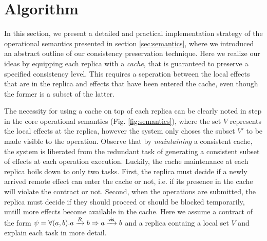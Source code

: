 \section{Algorithm}
%
In this section, we present a detailed and practical implementation
strategy of the operational semantics presented in section \ref{sec:semantics},
where we introduced an abstract outline of our consistency
preservation technique. Here we realize our ideas by equipping 
each replica with a \emph{cache}, that is guaranteed to
preserve a specified consistency level. This requires a seperation
between the local effects that are in the replica and effects that have
been entered the cache, even though the former is a subset of the latter. 

The necessity for using a cache on top of each replica  can be clearly noted 
in \visrule step in the core operational
semantics (Fig. \ref{fig:semantics}), where the set $V$
represents the local effects at the replica, however the system only
choses the subset $V'$ to be made visible to the operation. Observe
that by \emph{maintaining} a consistent cache, the system is liberated from the
redundant task of generating a consistent subset of effects at each
operation execution.
Luckily, the cache maintenance at each replica boils down to only two
tasks. First, the
replica must decide if a newly arrived remote effect can enter the
cache or not, i.e. if its presence in the cache will violate the
contract or not.  Second, when the operations are submitted, the replica
must decide if they should proceed or should be blocked temporarily,
untill more effects become available in the cache.  Here we assume a
contract of the form  
$\psi = \forall (a,b). a \xrightarrow{R} b  \Rightarrow a
\xrightarrow{{\normalfont \textsf{vis}}} b$ and a replica containg a local set $V$ and explain each task in more detail.

